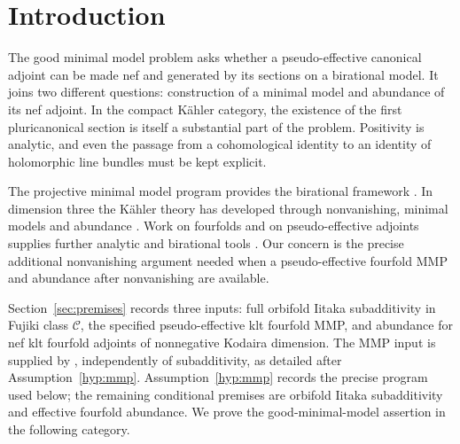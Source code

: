 \section{Introduction}\label{sec:introduction}

The good minimal model problem asks whether a pseudo-effective
canonical adjoint can be made nef and generated by its sections on a
birational model. It joins two different questions: construction of a
minimal model and abundance of its nef adjoint. In the compact
K\"ahler category, the existence of the first pluricanonical section
is itself a substantial part of the problem. Positivity is analytic,
and even the passage from a cohomological identity to an identity of
holomorphic line bundles must be kept explicit.

The projective minimal model program provides the birational framework
\cite{BirationalGeometry,BCHM}. In dimension three the K\"ahler
theory has developed through nonvanishing, minimal models and
abundance \cite{DemaillyPeternellNonvanishing,HPMinimalModels,
CHPAbundance,CHPAbundanceErratum,GuenanciaPaunBogomolovGieseker}.
Work on fourfolds and on
pseudo-effective adjoints supplies further analytic and birational
tools \cite{DHPFourfoldMMP,HLLNonvanishing}. Our concern is the
precise additional nonvanishing argument needed when a
pseudo-effective fourfold MMP and abundance after nonvanishing are
available.

Section~\ref{sec:premises} records three inputs: full orbifold
Iitaka subadditivity in Fujiki class \(\mathcal C\), the specified
pseudo-effective klt fourfold MMP, and abundance for nef klt fourfold
adjoints of nonnegative Kodaira dimension. The MMP input is supplied
by \cite[Theorem~6.24 and Proposition~3.4]{GrantMMP}, independently
of subadditivity, as detailed after Assumption~\ref{hyp:mmp}.
Assumption~\ref{hyp:mmp} records the precise program used below;
the remaining conditional premises are orbifold Iitaka subadditivity
and effective fourfold abundance. We prove the good-minimal-model
assertion in the following category.

